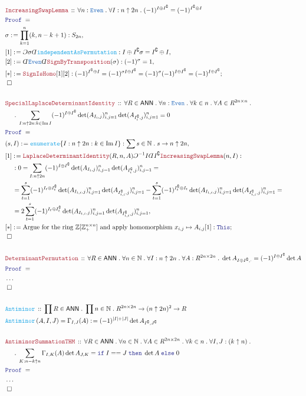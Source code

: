 \documentclass[12pt]{scrartcl}%
\newcommand{\TYPE}[1]{\textcolor{NavyBlue}{\mathtt{#1}}}%
\newcommand{\FUNC}[1]{\textcolor{Cerulean}{\mathtt{#1}}}%
\newcommand{\LOGIC}[1]{\textcolor{Blue}{\mathtt{#1}}}%
\newcommand{\THM}[1]{\textcolor{Maroon}{\mathtt{#1}}}%
\renewcommand{\.}{\; . \;} %
\newcommand{\de}{: \kern 0.1pc =} %
\newcommand{\If}{\LOGIC{if} \;} %
\newcommand{\Then}{ \; \LOGIC{then} \;} %
\newcommand{\Else}{\; \LOGIC{else} \;} %
\newcommand{\Act}[1]{\left( #1 \right)} %
\newcommand{\Theorem}[2]{& \THM{#1} \, :: \, #2 \\ & \Proof = \\ } %
\newcommand{\DeclareFunc}[2]{& \FUNC{#1} \, :: \, #2 \\}%
\newcommand{\DefineNamedFunc}[4]{&  \FUNC{#1}\Act{#2} = #3 \de #4 \\}%
\newcommand{\NewLine}{\\ & \kern 1pc}%
\newcommand{\Page}[1]{ \begin{align*} #1 \end{align*}  }%
\newcommand{ \bd }{ \ByDef }%
\newcommand{\NoProof}{ & \ldots \\ \EndProof}%
\newcommand{\Int}{\mathbb{Z}}%
\newcommand{\Nat}{\mathbb{N}}%
\DeclareMathOperator*{\im}{Im}%
\renewcommand{\c}{\complement}%
\newcommand{\Say}[3]{& #1 \de #2 : #3, \\} %
\newcommand{\Conclude}[3]{& #1 \de #2 : #3; \\}%
\newcommand{\QED}{\; \square} %
\newcommand{\EndProof}{& \QED \\} %
\newcommand{\ByDef}{\rotatebox[origin=c]{-180}{$D$}}%
\newcommand{\ByConstr}{\rotatebox[origin=c]{-180}{$C$}}%
\newcommand{\Proof}{\LOGIC{Proof} \; } %
\newcommand{\ANN}{\mathsf{ANN}} %
\begin{document}
\Page{
	\Theorem{IncreasingSwapLemma}{\forall n : \TYPE{Even} \. \forall I : n \uparrow 2n \. (-1)^{I \oplus I^\c} = (-1)^{I^\c \oplus I}}
	\Say{\sigma}{\prod^n_{k=1} (k, n-k+1)}{S_{2n}}
	\Say{[1]}{\ByConstr \sigma \bd \FUNC{independentAsPermutation}}{ I \oplus I^\c \sigma = I^\c \oplus I }
	\Say{[2]}{ \bd \TYPE{Even}\bd \THM{SignByTransposition}(\sigma)}{(-1)^\sigma = 1}
	\Conclude{[*]}{\THM{SignIsHomo}[1][2]}{(-1)^{I^\c \oplus I} = (-1)^{\sigma I \oplus I^\c} = (-1)^\sigma (-1)^{I \oplus I^\c} = (-1)^{I \oplus I^\c}}
	\EndProof
	\\
	\Theorem{SpecialLaplaceDeterminantIdentity}
	{
		\forall R \in \ANN \.
		\forall n : \TYPE{Even} \. 
		\forall k \in n \. 
		\forall A \in R^{2n \times n} \.
		\NewLine \. 
		\sum_{I :  n \uparrow 2n : k \in \im I }  (-1)^{I \oplus I^\c} \det (A_{I_i,j})^n_{i,j=1} \det (A_{I_i^\c,j})^n_{i,j=1} = 0 
	}
	\Say{(s,I)}{\FUNC{enumerate}\{ I : n \uparrow 2n : k \in \im I  \}}{\sum s \in \Nat \. s \to n \uparrow 2n }
	\Say{[1]}{ \THM{LaplaceDeterminantIdentity}(R,n,A)\ByConstr^{-1} I \bd I^\c  \THM{IncreasingSwapLemma}(n,I) }
	{
		\NewLine :
		0 = \sum_{I :  n \uparrow 2n }  (-1)^{I \oplus I^\c} \det (A_{I_i,j})^n_{i,j=1} \det (A_{I_i^\c,j})^n_{i,j=1} = \NewLine = 
		\sum^s_{t=1} (-1)^{I_t \oplus I^\c_t}\det (A_{I_{t,i},j})^n_{i,j=1} \det (A_{I_{t,i}^\c,j})^n_{i,j=1} 
		-
		\sum^s_{t=1} (-1)^{I_t^\c \oplus I_t}\det (A_{I_{t,i},j})^n_{i,j=1} \det (A_{I_{t,i}^\c,j})^n_{i,j=1} = \NewLine = 
		2\sum^s_{t=1} (-1)^{I_t \oplus I^\c_t}\det (A_{I_{t,i},j})^n_{i,j=1} \det (A_{I_{t,i}^\c,j})^n_{i,j=1} 
	}
	\Conclude{[*]}{\text{Argue for the ring $\Int[\Int_+^{n \times n}]$ and apply homomorphism $x_{i,j} \mapsto A_{i,j}$}[1]}
	{\LOGIC{This} }
	\EndProof
	\\
	\Theorem{DeterminantPermutation}{ 
		\forall R \in \ANN \.
		\forall n \in \Nat \.
		\forall I : n \uparrow 2n \.
		\forall A : R^{2n \times 2n} \.
		 \det A_{I \oplus I^\c,\cdot} = (-1)^{I \oplus I^\c} \det A
	}
	\NoProof
	\\
	\DeclareFunc{Antiminor}{\prod R \in \ANN \. \prod n \in \Nat \. R^{2n \times 2n} \to (n \uparrow 2n)^2 \to R}
	\DefineNamedFunc{Antiminor}{A,I,J}{\Gamma_{I,J}(A)}{ (-1)^{|I| + |J|} \det A_{I^\c,J^\c}  }
	\\
	\Theorem{AntiminorSummationTHM}
	{
		\forall R \in \ANN \. 
		\forall n \in \Nat \. 
		\forall A \in R^{2n \times 2n} \.
		\forall k \in n \.
		\forall I,J  :  (k \uparrow n) \. \NewLine \. 
		\sum_{K : n - k \uparrow n} \Gamma_{I,K}(A) \det A_{J,K}   = 
		\If I == J \Then \det A \Else 0
	}
	\NoProof
	\\
}
\end{document}

